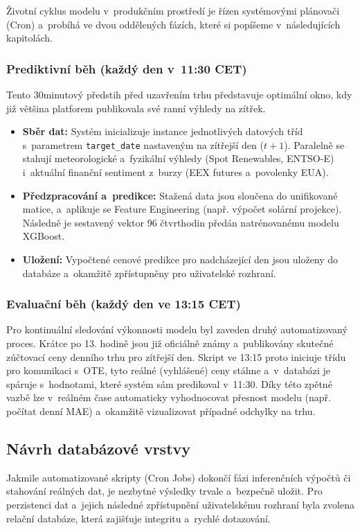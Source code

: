 \documentclass[a4paper]{article}
\begin{document}
Životní cyklus modelu v~produkčním prostředí je řízen systémovými plánovači (Cron) a~probíhá ve dvou oddělených fázích, které si popíšeme v~následujících kapitolách.

\newpage
\subsubsection{Prediktivní běh (každý den v~11:30 CET)}
Tento 30minutový předstih před uzavřením trhu představuje optimální okno, 
kdy již většina platforem publikovala své ranní výhledy na zítřek.
\begin{itemize}
    \item \textbf{Sběr dat:} Systém inicializuje instance jednotlivých datových tříd s~parametrem \texttt{target\_date} nastaveným na zítřejší den ($t+1$). Paralelně se stahují meteorologické a~fyzikální výhledy (Spot Renewables, ENTSO-E) i~aktuální finanční sentiment z~burzy (EEX futures a~povolenky EUA).
    \item \textbf{Předzpracování a~predikce:} Stažená data jsou sloučena do unifikované matice, a~aplikuje se Feature Engineering (např. výpočet solární projekce). Následně je sestavený vektor 96 čtvrthodin předán natrénovanému modelu XGBoost.
    \item \textbf{Uložení:} Vypočtené cenové predikce pro nadcházející den jsou uloženy do databáze a~okamžitě zpřístupněny pro uživatelské rozhraní.
\end{itemize}

\subsubsection{Evaluační běh (každý den ve 13:15 CET)}
Pro kontinuální sledování výkonnosti modelu byl zaveden druhý automatizovaný proces. Krátce po 13. hodině jsou již oficiálně známy a~publikovány skutečné zúčtovací ceny denního trhu pro zítřejší den. Skript ve 13:15 proto iniciuje třídu pro komunikaci s~OTE, tyto reálné (vyhlášené) ceny stáhne a~v~databázi je spáruje s~hodnotami, které systém sám predikoval v~11:30. Díky této zpětné vazbě lze v~reálném čase automaticky vyhodnocovat přesnost modelu (např. počítat denní MAE) a~okamžitě vizualizovat případné odchylky na trhu.

\subsection{Návrh databázové vrstvy}
Jakmile automatizované skripty (Cron Jobs) dokončí fázi inferenčních výpočtů či stahování reálných dat, je nezbytné výsledky trvale a~bezpečně uložit. Pro perzistenci dat a~jejich následné zpřístupnění uživatelskému rozhraní byla zvolena relační databáze, která zajišťuje integritu a~rychlé dotazování.
\end{document}
